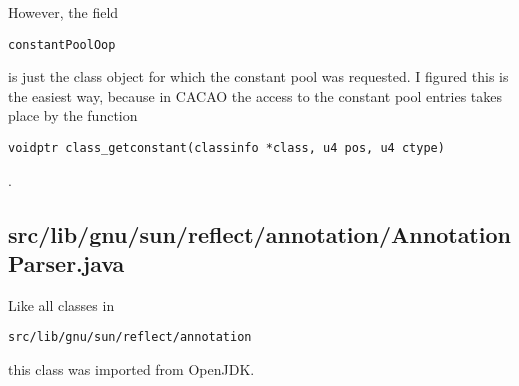\documentclass[a4paper, 10pt, titlepage]{scrartcl} %
\begin{document}
However, the field \begin{scriptsize}\verb|constantPoolOop|\end{scriptsize} is just the class object for which the
constant pool was requested. I figured this is the easiest way, because in
CACAO the access to the constant pool entries takes place by the function
\begin{scriptsize}\verb|voidptr|\hspace{0.0pt}\verb| |\hspace{0.0pt}\verb|class_getconstant|\hspace{0.0pt}\verb|(|\hspace{0.0pt}\verb|classinfo|\hspace{0.0pt}\verb| |\hspace{0.0pt}\verb||\hspace{0.0pt}\verb|*|\hspace{0.0pt}\verb|class|\hspace{0.0pt}\verb|,|\hspace{0.0pt}\verb||\hspace{0.0pt}\verb| |\hspace{0.0pt}\verb|u4|\hspace{0.0pt}\verb| |\hspace{0.0pt}\verb|pos|\hspace{0.0pt}\verb|,|\hspace{0.0pt}\verb||\hspace{0.0pt}\verb| |\hspace{0.0pt}\verb|u4|\hspace{0.0pt}\verb| |\hspace{0.0pt}\verb|ctype|\hspace{0.0pt}\verb|)|\hspace{0.0pt}\verb||\end{scriptsize}.

\subsection{src/lib/gnu/sun/reflect/annotation/AnnotationParser.java}
\label{sec:src/lib/gnu/sun/reflect/annotation/AnnotationParser.java}

Like all classes in \begin{scriptsize}\verb|src|\hspace{0.0pt}\verb|/|\hspace{0.0pt}\verb|lib|\hspace{0.0pt}\verb|/|\hspace{0.0pt}\verb|gnu|\hspace{0.0pt}\verb|/|\hspace{0.0pt}\verb|sun|\hspace{0.0pt}\verb|/|\hspace{0.0pt}\verb|reflect|\hspace{0.0pt}\verb|/|\hspace{0.0pt}\verb|annotation|\end{scriptsize} this class was
imported from OpenJDK.
\end{document}
